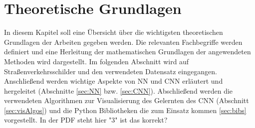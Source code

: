 \newpage
\section{Theoretische Grundlagen} \label{infos}
In diesem Kapitel soll eine Übersicht über die wichtigsten theoretischen Grundlagen der Arbeiten gegeben werden. Die relevanten Fachbegriffe werden definiert und eine Herleitung der mathematischen Grundlagen der angewendeten Methoden wird dargestellt. Im folgenden Abschnitt wird auf Straßenverkehrsschilder und den verwendeten Datensatz eingegangen.  Anschließend werden wichtige Aspekte von \ac{NN} und \ac{CNN} erläutert und hergeleitet (Abschnitte \ref{sec:NN} bzw. \ref{sec:CNN}). Abschließend werden die verwendeten Algorithmen zur Visualisierung des Gelernten des \ac{CNN} (Abschnitt \ref{sec:visAlgos}) und die Python Bibliotheken die zum Einsatz kommen \ref{sec:bibs} vorgestellt. In der PDF steht hier "3" ist das korrekt?
 



